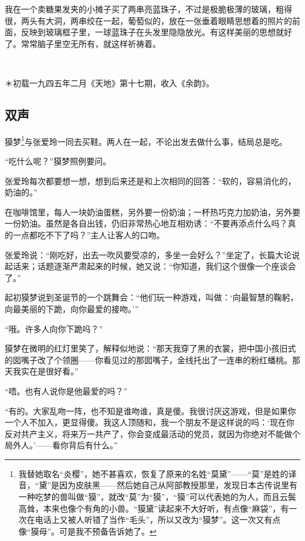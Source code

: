 \par 我在一个卖糖果发夹的小摊子买了两串亮蓝珠子，不过是极脆极薄的玻璃，粗得很，两头有大洞，两串绞在一起，葡萄似的，放在一张垂着眼睛思想着的照片的前面，反映到玻璃框子里，一球蓝珠子在头发里隐隐放光。有这样美丽的思想就好了。常常脑子里空无所有，就这样祈祷着。
\par  
\par ＊初载一九四五年二月《天地》第十七期，收入《余韵》。


\subsection{双声}

\par 獏梦\footnote{我替她取名“炎樱”，她不甚喜欢，恢复了原来的名姓“莫黛”——“莫”是姓的译音，“黛”是因为皮肤黑——然后她自己从阿部教授那里，发现日本古传说里有一种吃梦的兽叫做“獏”，就改“莫”为“獏”，“獏”可以代表她的为人，而且云鬓高耸，本来也像个有角的小兽。“獏黛”读起来不大好听，有点像“麻袋”，有一次在电话上又被人听错了当作“毛头”，所以又改为“獏梦”。这一次又有点像“獏母”。可是我不预备告诉她了。}与张爱玲一同去买鞋。两人在一起，不论出发去做什么事，结局总是吃。
\par “吃什么呢？”獏梦照例要问。
\par 张爱玲每次都要想一想，想到后来还是和上次相同的回答：“软的，容易消化的，奶油的。”
\par 在咖啡馆里，每人一块奶油蛋糕，另外要一份奶油；一杯热巧克力加奶油，另外要一份奶油。虽然是各自出钱，仍旧非常热心地互相劝诱：“不要再添点什么吗？真的一点都吃不下了吗？”主人让客人的口吻。
\par 张爱玲说：“刚吃好，出去一吹风要受凉的，多坐一会好么？”坐定了，长篇大论说起话来；话题逐渐严肃起来的时候，她又说：“你知道，我们这个很像一个座谈会了。”
\par 起初獏梦说到圣诞节的一个跳舞会：“他们玩一种游戏，叫做：‘向最智慧的鞠躬，向最美丽的下跪，向你最爱的接吻。’”
\par “哦。许多人向你下跪吗？”
\par 獏梦在微明的红灯里笑了，解释似地说：“那天我穿了黑的衣裳，把中国小孩旧式的囡嘴子改了个领圈——你看见过的那囡嘴子，金线托出了一连串的粉红蟠桃。那天我实在是很好看。”
\par “唔。也有人说你是他最爱的吗？”
\par “有的。大家乱吻一阵，也不知是谁吻谁，真是傻。我很讨厌这游戏，但是如果你一个人不加入，更显得傻。我这人顶随和，我一个朋友不是这样说的吗：‘现在你反对共产主义，将来万一共产了，你会变成最活动的党员，就因为你绝对不能做个局外人。’——看你背后有什么。”
